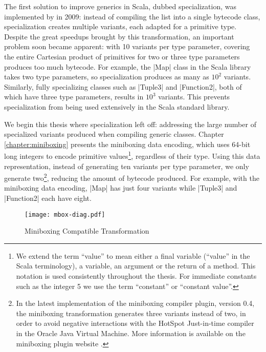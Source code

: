 The first solution to improve generics in Scala, dubbed specialization, was implemented by  \cite{iuli-thesis, specialization-iuli} in 2009: instead of compiling the list into a single bytecode class, specialization creates multiple variants, each adapted for a primitive type. Despite the great speedups brought by this transformation, an important problem soon became apparent: with 10 variants per type parameter, covering the entire Cartesian product of primitives for two or three type parameters produces too much bytecode. For example, the |Map| class in the Scala library takes two type parameters, so specialization produces as many as $10^2$ variants. Similarly, fully specializing classes such as |Tuple3| and |Function2|, both of which have three type parameters, results in $10^3$ variants. This prevents specialization from being used extensively in the Scala standard library.

We begin this thesis where specialization left off: addressing the large number of specialized variants produced when compiling generic classes. Chapter \ref{chapter:miniboxing} presents the miniboxing data encoding, which uses 64-bit long integers to encode primitive values\footnote{We extend the term ``value'' to mean either a final variable (``value'' in the Scala terminology), a variable, an argument or the return of a method. This notation is used consistently throughout the thesis. For immediate constants such as the integer 5 we use the term ``constant'' or ``constant value''.}, regardless of their type. Using this data representation, instead of generating ten variants per type parameter, we only generate two\footnote{In the latest implementation of the miniboxing compiler plugin, version 0.4, the miniboxing transformation generates three variants instead of two, in order to avoid negative interactions with the HotSpot Just-in-time compiler in the Oracle Java Virtual Machine. More information is available on the miniboxing plugin website \cite{miniboxing-www}.}, reducing the amount of bytecode produced. For example, with the miniboxing data encoding, |Map| has just four variants while |Tuple3| and |Function2| each have eight. %

\begin{figure}[h!]
  \centering
  \texttt{[image: mbox-diag.pdf]}
  \caption{Miniboxing Compatible Transformation}
\end{figure}

